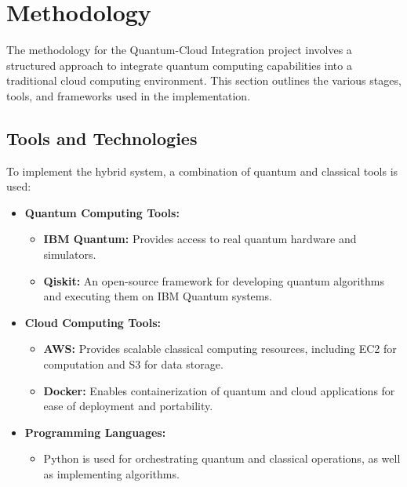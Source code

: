 \documentclass[12pt,a4paper]{article}
\begin{document}
\begin{center}
    \fontsize{14}{16}\selectfont \bfseries
    \section{Methodology}
\end{center}


The methodology for the Quantum-Cloud Integration project involves a structured approach to integrate quantum computing capabilities into a traditional cloud computing environment. This section outlines the various stages, tools, and frameworks used in the implementation.

\subsection{Tools and Technologies}
To implement the hybrid system, a combination of quantum and classical tools is used:
\begin{itemize}
    \item \textbf{Quantum Computing Tools:}
    \begin{itemize}
        \item \textbf{IBM Quantum:} Provides access to real quantum hardware and simulators.
        \item \textbf{Qiskit:} An open-source framework for developing quantum algorithms and executing them on IBM Quantum systems.
    \end{itemize}
    \item \textbf{Cloud Computing Tools:}
    \begin{itemize}
        \item \textbf{AWS:} Provides scalable classical computing resources, including EC2 for computation and S3 for data storage.
        \item \textbf{Docker:} Enables containerization of quantum and cloud applications for ease of deployment and portability.
    \end{itemize}
    \item \textbf{Programming Languages:}
    \begin{itemize}
        \item Python is used for orchestrating quantum and classical operations, as well as implementing algorithms.
    \end{itemize}
\end{itemize}
\end{document}
